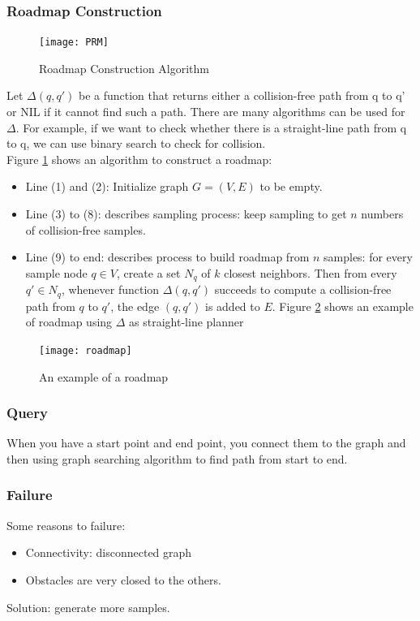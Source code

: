 \documentclass[11pt]{article}
\begin{document}
\subsubsection{Roadmap Construction}
\begin{figure}[h]
\texttt{[image: PRM]}
\centering
\caption{Roadmap Construction Algorithm}
\label{fig:roadmap_alg}
\end{figure}
Let $\Delta(q, q')$ be a function that returns either a collision-free path from q to q' or NIL if it cannot find such a path. There are many algorithms can be used for $\Delta$. For example, if we want to check whether there is a straight-line path from q to q, we can use binary search to check for collision.\\
Figure \ref{fig:roadmap_alg} shows an algorithm to construct a roadmap:
\begin{itemize}
\item Line (1) and (2): Initialize graph $G=(V,E)$ to be empty.
\item Line (3) to (8): describes sampling process: keep sampling to get $n$ numbers of collision-free samples.
\item Line (9) to end: describes process to build roadmap from $n$ samples: for every sample node $q\in V$, create a set $N_q$ of $k$ closest neighbors. Then from every $q' \in N_q$, whenever function $\Delta(q, q')$ succeeds to compute a collision-free path from $q$ to $q'$, the edge $(q,q')$ is added to $E$. Figure \ref{fig:roadmap_example} shows an example of roadmap using $\Delta$ as straight-line planner
\end{itemize}

\begin{figure}[h]
\texttt{[image: roadmap]}
\centering
\caption{An example of a roadmap }
\label{fig:roadmap_example}
\end{figure}

\subsubsection{Query}
When you have a start point and end point, you connect them to the graph and then using graph searching algorithm to find path from start to end.

\subsubsection{Failure}
Some reasons to failure:
\begin{itemize}
\item Connectivity: disconnected graph
\item Obstacles are very closed to the others. 
\end{itemize}
Solution: generate more samples.\\
\end{document}
